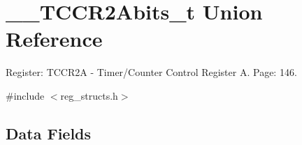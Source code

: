 \hypertarget{union_____t_c_c_r2_abits__t}{\section{\+\_\+\+\_\+\+T\+C\+C\+R2\+Abits\+\_\+t Union Reference}
\label{union_____t_c_c_r2_abits__t}
}


Register\+: T\+C\+C\+R2\+A -\/ Timer/\+Counter Control Register A. Page\+: 146.  




{\ttfamily \#include $<$reg\+\_\+structs.\+h$>$}

\subsection*{Data Fields}
